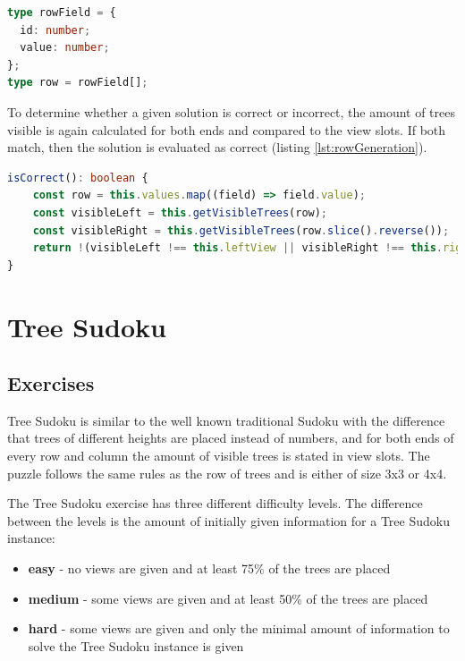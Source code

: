 \begin{lstlisting}[language=TypeScript,caption={Definition of the custom row and rowField type},label={lst:rowType}]
type rowField = {
  id: number;
  value: number;
};
type row = rowField[];
\end{lstlisting}

To determine whether a given solution is correct or incorrect, the amount of trees visible is again calculated for both ends and compared to the view slots. If both match, then the solution is evaluated as correct (listing \ref{lst:rowGeneration}).

\begin{lstlisting}[language=TypeScript,caption={Correctness check of a row of trees exercise},label={lst:rowCorrectness}]
isCorrect(): boolean {
    const row = this.values.map((field) => field.value);
    const visibleLeft = this.getVisibleTrees(row);
    const visibleRight = this.getVisibleTrees(row.slice().reverse());
    return !(visibleLeft !== this.leftView || visibleRight !== this.rightView);
}
\end{lstlisting}

\section{Tree Sudoku}
\label{section:treeSudoku}

\subsection{Exercises}
Tree Sudoku is similar to the well known traditional Sudoku with the difference that trees of different heights are placed instead of numbers, and for both ends of every row and column the amount of visible trees is stated in view slots. The puzzle follows the same rules as the row of trees and is either of size 3x3 or 4x4.

The Tree Sudoku exercise has three different difficulty levels. The difference between the levels is the amount of initially given information for a Tree Sudoku instance:

\begin{itemize}
    \item \textbf{easy} - no views are given and at least 75\% of the trees are placed
    \item \textbf{medium} - some views are given and at least 50\% of the trees are placed
    \item \textbf{hard} - some views are given and only the minimal amount of information to solve the Tree Sudoku instance is given
\end{itemize}


